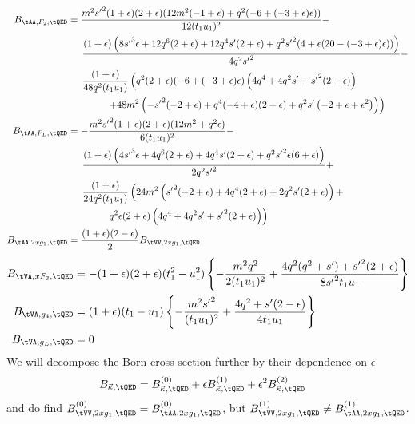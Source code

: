 \begin{align}
B_{\tAA,F_2,\tQED} &= \frac{{m^2} {s'}^2 (1+\epsilon ) (2+\epsilon ) (12 {m^2} (-1+\epsilon )+{q^2} (-6+(-3+\epsilon ) \epsilon ))}{12 (t_1 u_1)^2}-\nonumber\\
 &\hspace{15pt} \frac{(1+\epsilon ) \left(8 {s'}^3 \epsilon +12 {q^6} (2+\epsilon )+12 {q^4} {s'} (2+\epsilon )+{q^2} {s'}^2 (4+\epsilon  (20-(-3+\epsilon ) \epsilon ))\right)}{4 {q^2} {s'}^2}-\nonumber\\
 &\hspace{15pt}\frac{(1+\epsilon )}{48 {q^2} (t_1 u_1)}\left({q^2} (2+\epsilon ) (-6+(-3+\epsilon ) \epsilon ) \left(4 {q^4}+4 {q^2} {s'}+{s'}^2 (2+\epsilon )\right)\right.\nonumber\\
 &\hspace{40pt} \left. +48 {m^2} \left(-{s'}^2 (-2+\epsilon )+{q^4} (-4+\epsilon ) (2+\epsilon )+{q^2} {s'} \left(-2+\epsilon +\epsilon ^2\right)\right)\right)\\
B_{\tAA,F_L,\tQED} &= -\frac{{m^2} {s'}^2 (1+\epsilon ) (2+\epsilon ) (12 {m^2}+{q^2} \epsilon )}{6 (t_1 u_1)^2}-\nonumber\\
 &\hspace{15pt}\frac{(1+\epsilon ) \left(4 {s'}^3 \epsilon +4 {q^6} (2+\epsilon )+4 {q^4} {s'} (2+\epsilon )+{q^2} {s'}^2 \epsilon  (6+\epsilon )\right)}{2 {q^2} {s'}^2}+\nonumber\\
 &\hspace{15pt}\frac{(1+\epsilon )}{24 {q^2} (t_1 u_1)} \left(24 {m^2} \left({s'}^2 (-2+\epsilon )+4 {q^4} (2+\epsilon )+2 {q^2} {s'} (2+\epsilon )\right)+\right.\nonumber\\
 &\hspace{40pt} \left. {q^2} \epsilon  (2+\epsilon ) \left(4 {q^4}+4 {q^2} {s'}+{s'}^2 (2+\epsilon )\right)\right)\\
B_{\tAA,2xg_1,\tQED} &= \frac{(1+\epsilon)(2-\epsilon)}{2}B_{\tVV,2xg_1,\tQED}
\end{align}
\begin{align}
B_{\tVA,xF_3,\tQED} &= -(1+\epsilon)(2+\epsilon)(t_1^2-u_1^2)\left\{- \frac{m^2q^2}{2(t_1u_1)^2} + \frac{4q^2(q^2+s')+{s'}^2(2+\epsilon)}{8 {s'}^2 t_1 u_1}\right\}\\
B_{\tVA,g_4,\tQED} &= (1+\epsilon)(t_1-u_1)\left\{- \frac{m^2{s'}^2}{(t_1u_1)^2} +  \frac{4q^2 + s'(2-\epsilon)}{4 t_1 u_1} \right\}\\
B_{\tVA,g_L,\tQED} &= 0
\end{align}
We will decompose the Born cross section further by their dependence on $\epsilon$
\begin{align}
B_{\vec \kappa,\tQED} &= B^{(0)}_{\vec \kappa,\tQED} + \epsilon B^{(1)}_{\vec \kappa,\tQED} + \epsilon^2 B^{(2)}_{\vec \kappa,\tQED}
\end{align}
and do find $B^{(0)}_{\tVV,2xg_1,\tQED}=B^{(0)}_{\tAA,2xg_1,\tQED}$, but $B^{(1)}_{\tVV,2xg_1,\tQED}\neq B^{(1)}_{\tAA,2xg_1,\tQED}$.

